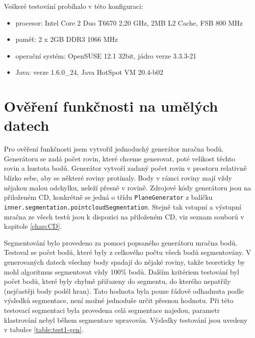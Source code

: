 \documentclass[11pt,twoside,a4paper]{book}
\begin{document}
\noindent
Veškeré testování probíhalo v této konfiguraci:
\begin{itemize}
 \item procesor: Intel Core 2 Duo T6670 2,20 GHz, 2MB L2 Cache, FSB 800 MHz
 \item paměť: 2 x 2GB DDR3 1066 MHz 
 \item operační systém: OpenSUSE 12.1 32bit, jádro verze 3.3.3-21
 \item Java: verze 1.6.0\_24, Java HotSpot VM 20.4-b02
\end{itemize}

\section{Ověření funkčnosti na umělých datech}

Pro ověření funkčnosti jsem vytvořil jednoduchý generátor mračna bodů. Generátoru se zadá počet rovin, které chceme generovat, poté velikost těchto rovin a hustota bodů. Generátor vytvoří zadaný počet rovin v prostoru relativně blízko sebe, aby se některé roviny protínaly. Body v rámci roviny mají vždy nějakou malou odchylku, neleží přesně v rovině. Zdrojové kódy generátoru jsou na přiloženém CD, konkrétně se jedná o třídu \verb|PlaneGenerator| z balíčku \verb|inner.segmentation.pointcloudSegmentation|. Stej\-ně tak vstupní a výstupní mračna ze všech testů jsou k dispozici na přiloženém CD, viz seznam souborů v kapitole \ref{chap:CD}. 


Segmentování bylo provedeno za pomoci popsaného generátoru mračna bodů. Testoval se počet bodů, které byly z celkového počtu všech bodů segmentovány. V generovaných datech všechny body spadají do nějaké roviny, takže teoreticky by mohl algoritmus segmentovat vždy 100\% bodů. Dalším kritériem testování byl počet bodů, které byly chybně přiřazeny do segmentu, do kterého nepatřily (nejčastěji body podél hran). Tato hodnota byla pouze řádově odhadnuta podle výsledků segmentace, není možné jednoduše určit přesnou hodnotu. Při této testovací segmentaci byla provedena celá segmentace najedou, parametr klastrování nebyl během segmentace upravován. Výsledky testování jsou uvedeny v tabulce \ref{table:test1-gen}.
\end{document}
